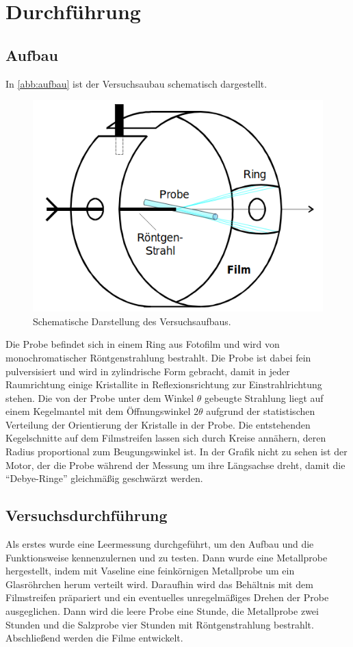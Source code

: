 \section{Durchführung}
\subsection{Aufbau}
In \autoref{abb:aufbau} ist der Versuchsaubau schematisch dargestellt.
\begin{figure}
  \centering
  \includegraphics[scale=0.5]{content/pics/aufbau.png}
  \caption{Schematische Darstellung des Versuchsaufbaus. \cite{anleitung}}
  \label{abb:aufbau}
\end{figure}
Die Probe befindet sich in einem Ring aus Fotofilm und wird von monochromatischer
Röntgenstrahlung bestrahlt. Die Probe ist dabei fein pulversisiert und wird in zylindrische
Form gebracht, damit in jeder Raumrichtung einige Kristallite in Reflexionsrichtung
zur Einstrahlrichtung stehen. Die von der Probe unter dem Winkel $\theta$ gebeugte
Strahlung liegt auf einem
Kegelmantel mit dem Öffnungswinkel $2\theta$ aufgrund der statistischen Verteilung der
Orientierung der Kristalle in der Probe. Die entstehenden Kegelschnitte auf dem Filmstreifen
lassen sich durch Kreise annähern, deren Radius proportional zum Beugungswinkel ist.
In der Grafik nicht zu sehen ist der Motor, der die Probe während der Messung um ihre
Längsachse dreht, damit die \enquote{Debye-Ringe} gleichmäßig geschwärzt werden.
\subsection{Versuchsdurchführung}
Als erstes wurde eine Leermessung durchgeführt, um den Aufbau und die Funktionsweise
kennenzulernen und zu testen. Dann wurde eine Metallprobe hergestellt, indem
mit Vaseline eine feinkörnigen Metallprobe um ein Glasröhrchen herum verteilt wird.
Daraufhin wird das Behältnis mit dem Filmstreifen präpariert und ein eventuelles
unregelmäßiges Drehen der Probe ausgeglichen. Dann wird die leere Probe eine Stunde,
die Metallprobe zwei Stunden und die Salzprobe vier Stunden mit Röntgenstrahlung
bestrahlt. Abschließend werden die Filme entwickelt.
